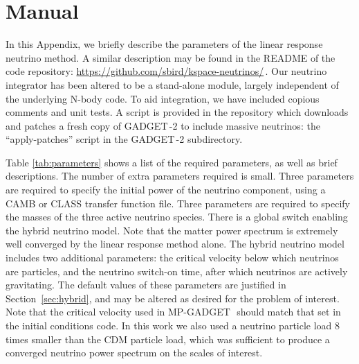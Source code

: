 \documentclass[useAMS, usenatbib]{mnras}
\newcommand{\gadget}{{\small GADGET\,}}
\begin{document}
\section{Manual}
\label{sec:manual}

In this Appendix, we briefly describe the parameters of the linear response neutrino method. A similar description may be found in the README of the code repository: \url{https://github.com/sbird/kspace-neutrinos/}\,. Our neutrino integrator has been altered to be a stand-alone module, largely independent of the underlying N-body code. To aid integration, we have included copious comments and unit tests. A script is provided in the repository which downloads and patches a fresh copy of \gadget-2 to include massive neutrinos: the ``apply-patches'' script in the \gadget-2 subdirectory.

Table \ref{tab:parameters} shows a list of the required parameters, as well as brief descriptions. The number of extra parameters required is small. Three parameters are required to specify the initial power of the neutrino component, using a CAMB or CLASS transfer function file. Three parameters are required to specify the masses of the three active neutrino species.
There is a global switch enabling the hybrid neutrino model. Note that the matter power spectrum is extremely well converged by the linear response method alone. The hybrid neutrino model includes two additional parameters: the critical velocity below which neutrinos are particles, and the neutrino switch-on time, after which neutrinos are actively gravitating. The default values of these parameters are justified in Section~\ref{sec:hybrid}, and may be altered as desired for the problem of interest.
Note that the critical velocity used in MP-\gadget~should match that set in the initial conditions code. In this work we also used a neutrino particle load $8$ times smaller than the CDM particle load, which was sufficient to produce a converged neutrino power spectrum on the scales of interest.
\end{document}
